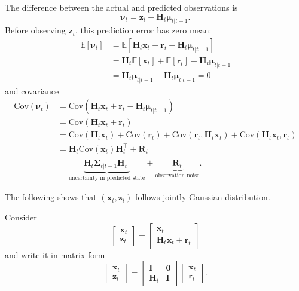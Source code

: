 \documentclass[../Bayesian_Inference.tex]{subfiles}
\begin{document}
The difference between the actual and predicted observations is
\[
    \bm{\nu}_{t} = \bm{z}_t - \mathbf{H}_{t} \bm{\mu}_{t | t-1}.
\]
Before observing $\bm{z}_t$, this prediction error has zero mean:
\[
    \begin{aligned}
        \mathbb{E}[\bm{\nu}_t] & = \mathbb{E}[\mathbf{H}_{t} \bm{x}_t + \bm{r}_t - \mathbf{H}_{t} \bm{\mu}_{t | t-1}] \\
        & = \mathbf{H}_{t} \mathbb{E}[\bm{x}_t] + \mathbb{E}[\bm{r}_t] - \mathbf{H}_{t} \bm{\mu}_{t | t-1} \\ 
        & = \mathbf{H}_{t} \bm{\mu}_{t | t-1} - \mathbf{H}_{t} \bm{\mu}_{t | t-1} = 0
    \end{aligned}
\]
and covariance
\[
\begin{aligned}
    \mathrm{Cov}(\bm{\nu}_{t}) & = \mathrm{Cov}(\mathbf{H}_{t} \bm{x}_t + \bm{r}_t - \mathbf{H}_{t} \bm{\mu}_{t | t-1}) \\
    & = \mathrm{Cov}(\mathbf{H}_{t} \bm{x}_t + \bm{r}_t) \\
    & = \mathrm{Cov}(\mathbf{H}_{t} \bm{x}_t) + \mathrm{Cov}(\bm{r}_t) + \mathrm{Cov}(\bm{r}_t, \mathbf{H}_{t} \bm{x}_t) + \mathrm{Cov}(\mathbf{H}_{t} \bm{x}_t, \bm{r}_t) \\
    & = \mathbf{H}_{t} \mathrm{Cov}(\bm{x}_t) \mathbf{H}_{t}^{\top} + \mathbf{R}_t \\
    & = \underbrace{\mathbf{H}_{t} \mathbf{\Sigma}_{t | t-1} \mathbf{H}_{t}^{\top}}_{\text{uncertainty in predicted state}} + \underbrace{\mathbf{R}_t}_{\text{observation noise}}.
\end{aligned}
\]

The following shows that $(\bm{x}_t, \bm{z}_t)$ follows jointly Gaussian distribution.

Consider 
\[
    \begin{bmatrix}
        \bm{x}_t \\
        \bm{z}_t
    \end{bmatrix} 
    =
    \begin{bmatrix}
        \bm{x}_t \\
        \mathbf{H}_t \bm{x}_t + \bm{r}_t
    \end{bmatrix} 
\]
and write it in matrix form 
\[
    \begin{bmatrix}
        \bm{x}_t \\
        \bm{z}_t
    \end{bmatrix} 
    =
    \begin{bmatrix}
        \mathbf{I} & \mathbf{0} \\
        \mathbf{H}_t & \mathbf{I}
    \end{bmatrix} 
    \begin{bmatrix}
        \bm{x}_t \\
        \bm{r}_t
    \end{bmatrix}.
\]
\end{document}

